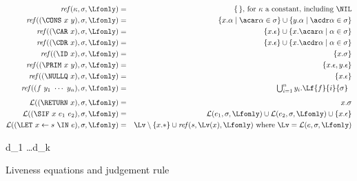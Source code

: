 \begin{figure}[t]  
\begin{eqnarray*}
\mathit{ref\/}(\kappa,\sigma,\Lfonly)
          &=& \{\,\} \mbox{, for $\kappa$ a constant, including $\NIL$}\\
\mathit{ref\/}((\CONS~x~y),\sigma,\Lfonly)
          &=& \{x.\alpha \mid \acar\alpha \in \sigma\} \cup \{y.\alpha \mid \acdr\alpha \in \sigma\} \\
\mathit{ref\/}((\CAR~x),\sigma,\Lfonly)
          &=& \{x.\epsilon\} \cup \{x.\acar\alpha \mid \alpha \in \sigma\} \\
\mathit{ref\/}((\CDR~x),\sigma,\Lfonly)
          &=& \{x.\epsilon\} \cup \{x.\acdr\alpha \mid \alpha \in \sigma\} \\
\mathit{ref\/}((\ID~x),\sigma,\Lfonly)
          &=& \{x.\sigma\} \\
\mathit{ref\/}((\PRIM~x~y),\sigma,\Lfonly)
          &=& \{x.\epsilon,y.\epsilon\} \\
\mathit{ref\/}((\NULLQ~x),\sigma,\Lfonly)
          &=& \{x.\epsilon\} \\
\mathit{ref\/}((f~y_1~\cdots~y_n),\sigma,\Lfonly)
          &=&  \begin{array}{@{}l}  %
               \bigcup_{i=1}^n y_i.\Lf{f}{i}{\sigma}
               \end{array}
\\[1ex]
\mathcal{L}((\RETURN~x),\sigma,\Lfonly) &=& x.\sigma \\
\mathcal{L}((\SIF~x~e_1~e_2),\sigma,\Lfonly) &=&
        \mathcal{L}(e_1,\sigma,\Lfonly) \cup
        \mathcal{L}(e_2,\sigma,\Lfonly) \cup
        \{x.\epsilon\} \\
\mathcal{L}((\LET~x \leftarrow  s~\IN~e),\sigma,\Lfonly) &=&
        \Lv
           \setminus \{x.*\}
           \cup \mathit{ref\/}(s,\Lv(x),\Lfonly)
\mbox{ where } \Lv = \mathcal{L}(e,\sigma,\Lfonly)
\end{eqnarray*}

\begin{minipage}{0.85\textwidth}
        { d_1 \ldots d_k \len \Lfonly
\\ }
\end{minipage}

\normalsize
  \caption{Liveness equations and judgement rule}\label{fig:live-judge}
\end{figure}
